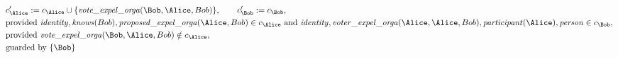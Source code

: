 \begin{align*}
&
c'_
{
\Alice
}
 := 
c_
{
\Alice
}
 \cup 
\{
\mathit{\detokenize{
vote_expel_orga
}}
(
\Bob
,
\Alice
,
Bob
)
\}
, \qquad 
c'_
{
\Bob
}
 := 
c_
{
\Bob
}
,\\
&
\text{provided } 
\mathit{\detokenize{
identity
}}
,
\mathit{\detokenize{
knows
}}
(
Bob
)
,
\mathit{\detokenize{
proposed_expel_orga
}}
(
\Alice
,
Bob
)
 \in c_
{
\Alice
}
 \text{ and } 
\mathit{\detokenize{
identity
}}
,
\mathit{\detokenize{
voter_expel_orga
}}
(
\Alice
,
\Alice
,
Bob
)
,
\mathit{\detokenize{
participant
}}
(
\Alice
)
,
\mathit{\detokenize{
person
}}
 \in c_
{
\Bob
}
,\\
&
\text{provided } 
\mathit{\detokenize{
vote_expel_orga
}}
(
\Bob
,
\Alice
,
Bob
)
 \notin c_
{
\Alice
}
,\\
&
\text{guarded by } \{
\Bob
\}
\end{align*}

